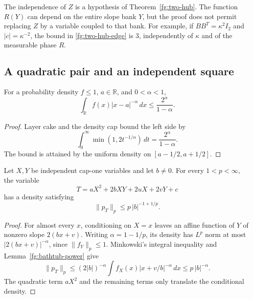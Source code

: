 \begin{remark}
The independence of $Z$ is a hypothesis of
Theorem~\ref{fg:two-hub}.  The function $R(Y)$ can depend on the
entire slope bank $Y$, but the proof does not permit replacing
$Z$ by a variable coupled to that bank.  For example, if
$BB^T=\kappa^2 I_2$ and $|c|=\kappa^{-2}$, the bound in
\eqref{fg:two-hub-edge} is $3$, independently of $\kappa$ and
of the measurable phase $R$.
\end{remark}

\subsection{A quadratic pair and an independent square}

\begin{lemma}
\label{fg:bathtub-power}
For a probability density $f\leq1$, $a\in\mathbb R$, and
$0<\alpha<1$,
\begin{equation}\label{fg:fractional-bathtub}
 \int_{\mathbb R}f(x)|x-a|^{-\alpha}\,dx
 \leq\frac{2^\alpha}{1-\alpha}.
\end{equation}
\end{lemma}
\begin{proof}
Layer cake and the density cap bound the left side by
\[
 \int_0^\infty\min(1,2t^{-1/\alpha})\,dt
 =\frac{2^\alpha}{1-\alpha}.
\]
The bound is attained by the uniform density on
$[a-1/2,a+1/2]$.
\end{proof}

\begin{lemma}
\label{fg:pair-lp}
Let $X,Y$ be independent cap-one variables and let
$b\ne0$.  For every $1<p<\infty$, the variable
\[
 T=aX^2+2bXY+2uX+2vY+c
\]
has a density satisfying
\begin{equation}\label{fg:pair-lp-bound}
 \|p_T\|_p\leq p\,|b|^{-1+1/p}.
\end{equation}
\end{lemma}
\begin{proof}
For almost every $x$, conditioning on $X=x$ leaves an affine
function of $Y$ of nonzero slope $2(bx+v)$.
Writing $\alpha=1-1/p$, its density has $L^p$ norm at most
$|2(bx+v)|^{-\alpha}$, since $\|f_Y\|_p\leq1$.
Minkowski's integral inequality and
Lemma~\ref{fg:bathtub-power} give
\[
 \|p_T\|_p
 \leq (2|b|)^{-\alpha}
      \int f_X(x)|x+v/b|^{-\alpha}\,dx
 \leq p\,|b|^{-\alpha}.
\]
The quadratic term $aX^2$ and the remaining terms only
translate the conditional density.
\end{proof}

